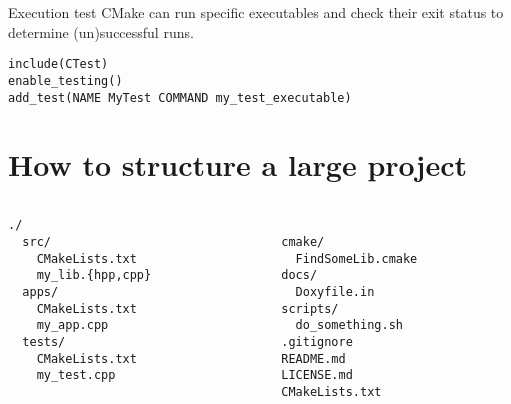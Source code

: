 \documentclass[aspectratio=169,11pt]{beamer}
\begin{document}
\begin{frame}[fragile]{Execution test}
CMake can run specific executables and check their exit status to determine (un)successful runs.
\begin{verbatim}
include(CTest)
enable_testing()
add_test(NAME MyTest COMMAND my_test_executable)
\end{verbatim}
\end{frame}

\section{How to structure a large project}
\begin{frame}
\Large
\begin{columns}[t]
    \begin{column}{0.5\textwidth}
        \begin{verbatim}
./
  src/
    CMakeLists.txt
    my_lib.{hpp,cpp}
  apps/
    CMakeLists.txt
    my_app.cpp
  tests/
    CMakeLists.txt
    my_test.cpp
        \end{verbatim}
    \end{column}
    \begin{column}{0.5\textwidth}
        \begin{verbatim}

  cmake/
    FindSomeLib.cmake
  docs/
    Doxyfile.in
  scripts/
    do_something.sh
  .gitignore
  README.md
  LICENSE.md
  CMakeLists.txt
        \end{verbatim}
    \end{column}
\end{columns}
\end{frame}
\addtocounter{framenumber}{1}
\end{document}
